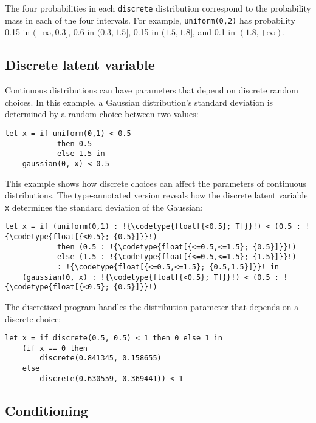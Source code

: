 \documentclass[acmsmall,screen,dvipsnames,x11names,nonacm,anonymous,review]{acmart}
\newcommand{\codetype}[1]{\textcolor{typecolor}{\ttfamily\small#1}}
\begin{document}
\noindent The four probabilities in each \texttt{discrete} distribution correspond to the probability mass in each of the four intervals. For example, \texttt{uniform(0,2)} has probability 0.15 in $(-\infty, 0.3]$, 0.6 in $(0.3, 1.5]$, 0.15 in $(1.5, 1.8]$, and 0.1 in $(1.8, +\infty)$.

\subsection{Discrete latent variable}

Continuous distributions can have parameters that depend on discrete random choices. In this example, a Gaussian distribution's standard deviation is determined by a random choice between two values:

\begin{lstlisting}[aboveskip=1em,belowskip=1em,escapechar=!]
    let x = if uniform(0,1) < 0.5 
            then 0.5
            else 1.5 in
    gaussian(0, x) < 0.5
\end{lstlisting}

\noindent This example shows how discrete choices can affect the parameters of continuous distributions. The type-annotated version reveals how the discrete latent variable \texttt{x} determines the standard deviation of the Gaussian:

\begin{lstlisting}[aboveskip=1em,belowskip=1em,escapechar=!]
    let x = if (uniform(0,1) : !{\codetype{float[{<0.5}; T]}}!) < (0.5 : !{\codetype{float[{<0.5}; {0.5}]}}!)
            then (0.5 : !{\codetype{float[{<=0.5,<=1.5}; {0.5}]}}!)
            else (1.5 : !{\codetype{float[{<=0.5,<=1.5}; {1.5}]}}!)
            : !{\codetype{float[{<=0.5,<=1.5}; {0.5,1.5}]}}! in
    (gaussian(0, x) : !{\codetype{float[{<0.5}; T]}}!) < (0.5 : !{\codetype{float[{<0.5}; {0.5}]}}!)
\end{lstlisting}

\noindent The discretized program handles the distribution parameter that depends on a discrete choice:

\begin{lstlisting}[aboveskip=1em,belowskip=1em]
    let x = if discrete(0.5, 0.5) < 1 then 0 else 1 in
    (if x == 0 then
        discrete(0.841345, 0.158655)
    else
        discrete(0.630559, 0.369441)) < 1
\end{lstlisting}

\subsection{Conditioning}
\end{document}
